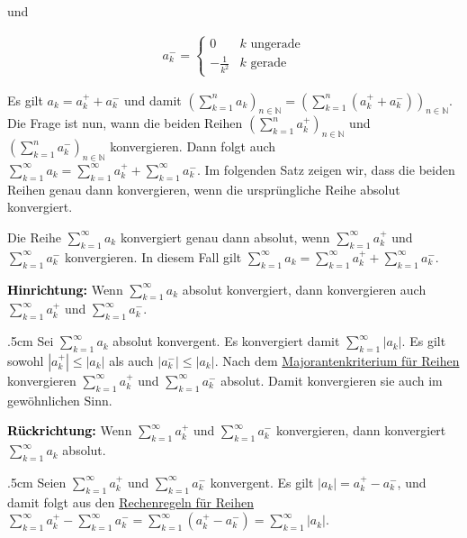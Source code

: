 \documentclass[fontsize=9pt,
               parskip=half-,
               DIV=14,
               listof=chapterentry,
               tocflat]{scrbook}
\newenvironment{indentblock}{\begin{adjustwidth}{.5cm}{}}{\end{adjustwidth}}
\newcommand{\proofstep}[1]{\textbf{\textcolor{Black}{#1}}}
\begin{document}
und

\begin{align*}
a_{k}^{-}={\begin{cases}0&k{\text{ ungerade}}\\-{\tfrac {1}{k^{2}}}&k{\text{ gerade}}\end{cases}}
\end{align*}

Es gilt $a_{k}=a_{k}^{+}+a_{k}^{-}$ und damit $\left(\sum _{k=1}^{n}a_{k}\right)_{n\in \mathbb {N} }=\left(\sum _{k=1}^{n}(a_{k}^{+}+a_{k}^{-})\right)_{n\in \mathbb {N} }$. Die Frage ist nun, wann die beiden Reihen $\left(\sum _{k=1}^{n}a_{k}^{+}\right)_{n\in \mathbb {N} }$ und $\left(\sum _{k=1}^{n}a_{k}^{-}\right)_{n\in \mathbb {N} }$ konvergieren. Dann folgt auch $\sum _{k=1}^{\infty }a_{k}=\sum _{k=1}^{\infty }a_{k}^{+}+\sum _{k=1}^{\infty }a_{k}^{-}$. Im folgenden Satz zeigen wir, dass die beiden Reihen genau dann konvergieren, wenn die ursprüngliche Reihe absolut konvergiert.

\begin{theorem*}
Die Reihe $\sum _{k=1}^{\infty }a_{k}$ konvergiert genau dann absolut, wenn $\sum _{k=1}^{\infty }a_{k}^{+}$ und $\sum _{k=1}^{\infty }a_{k}^{-}$ konvergieren. In diesem Fall gilt $\sum _{k=1}^{\infty }a_{k}=\sum _{k=1}^{\infty }a_{k}^{+}+\sum _{k=1}^{\infty }a_{k}^{-}$.

\end{theorem*}

\begin{proof*}
\proofstep{Hinrichtung:}
 Wenn $\sum _{k=1}^{\infty }a_{k}$ absolut konvergiert, dann konvergieren auch $\sum _{k=1}^{\infty }a_{k}^{+}$ und $\sum _{k=1}^{\infty }a_{k}^{-}$.\begin{indentblock}
Sei $\sum _{k=1}^{\infty }a_{k}$ absolut konvergent. Es konvergiert damit $\sum _{k=1}^{\infty }|a_{k}|$. Es gilt sowohl $|a_{k}^{+}|\leq |a_{k}|$ als auch $|a_{k}^{-}|\leq |a_{k}|$. Nach dem \href{https://de.wikibooks.org/wiki/Mathe\_für\_Nicht-Freaks:\_Majorantenkriterium\_und\_Minorantenkriterium}
{Majorantenkriterium für Reihen} konvergieren $\sum _{k=1}^{\infty }a_{k}^{+}$ und $\sum _{k=1}^{\infty }a_{k}^{-}$ absolut. Damit konvergieren sie auch im gewöhnlichen Sinn.

\end{indentblock}

\proofstep{Rückrichtung:}
 Wenn $\sum _{k=1}^{\infty }a_{k}^{+}$ und $\sum _{k=1}^{\infty }a_{k}^{-}$ konvergieren, dann konvergiert $\sum _{k=1}^{\infty }a_{k}$ absolut.\begin{indentblock}
Seien $\sum _{k=1}^{\infty }a_{k}^{+}$ und $\sum _{k=1}^{\infty }a_{k}^{-}$ konvergent. Es gilt $|a_{k}|=a_{k}^{+}-a_{k}^{-}$, und damit folgt aus den \href{https://de.wikibooks.org/wiki/Mathe\_für\_Nicht-Freaks:\_Rechenregeln\_für\_Reihen}
{Rechenregeln für Reihen} $\sum _{k=1}^{\infty }a_{k}^{+}-\sum _{k=1}^{\infty }a_{k}^{-}=\sum _{k=1}^{\infty }(a_{k}^{+}-a_{k}^{-})=\sum _{k=1}^{\infty }|a_{k}|$.

\end{indentblock}

\end{proof*}
\end{document}
